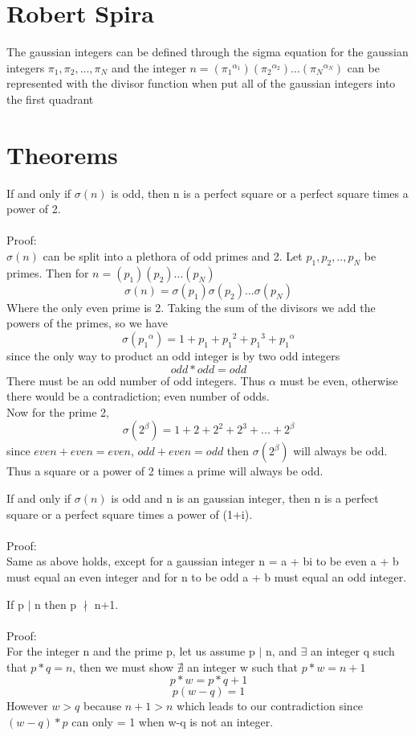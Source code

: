 \documentclass[12pt]{amsart}
\begin{document}
\section{Robert Spira}

The gaussian integers can be defined through the sigma equation for the gaussian integers $\pi_1, \pi_2, ..., \pi_N$ and the integer $n = ({\pi_1}^{\alpha_1})({\pi_2}^{\alpha_2})...({\pi_N}^{\alpha_N})$
can be represented with the divisor function when put all of the gaussian integers into the first quadrant
\\ 

\section{Theorems}

\thm
If and only if $\sigma(n)$ is odd, then n is a perfect square or a perfect square times a power of 2.
\\
\\
\noindent
Proof:
\\
$\sigma(n)$ can be split into a plethora of odd primes and 2. Let $p_1,p_2,.., p_N$ be primes. Then for $n = (p_1)(p_2)...(p_N)$
$$\sigma(n) = \sigma(p_1)\sigma(p_2)...\sigma(p_N)$$
Where the only even prime is 2. Taking the sum of the divisors we add the powers of the primes, so we have $$\sigma({p_1}^{\alpha}) = 1 + p_1 + {p_1}^2 + {p_1}^3 + {p_1}^{\alpha}$$
since the only way to product an odd integer is by two odd integers $$odd * odd = odd$$ There must be an odd number of odd integers. Thus $\alpha$ must be even, otherwise there would be a contradiction; even number of odds.
\\
Now for the prime 2, $$\sigma(2^\beta) = 1 + 2 + 2^2 + 2^3 + ... + 2^\beta$$
since $even + even = even$, $odd + even = odd$ then $\sigma(2^\beta)$ will always be odd. Thus a square or a power of 2 times a prime will always be odd.

\thm
If and only if $\sigma(n)$ is odd and n is an gaussian integer, then n is a perfect square or a perfect square times a power of (1+i).
\\
\\
\noindent
Proof:
\\
Same as above holds, except for a gaussian integer n = a + bi to be even a + b must equal an even integer and for n to be odd a + b must equal an odd integer. 

\thm
If p $\mid$ n then p $\nmid$ n+1.
\\
\\
\noindent
Proof:
\\
For the integer n  and the prime p, let us assume p $\mid$ n, and $\exists$ an integer q such that $p*q = n$, then we must show $\nexists$ an integer w such that $p*w = n+1$ $$p*w = p*q + 1$$ $$ p(w-q) = 1$$ However $w > q$ because $n+1>n$ which leads to our contradiction since $(w-q)*p$ can only = 1 when w-q is not an integer.
\end{document}
